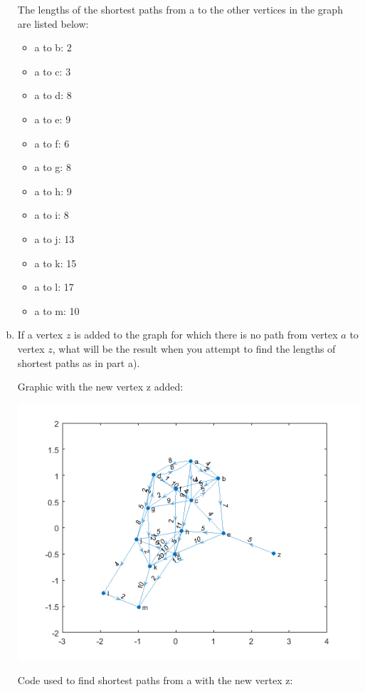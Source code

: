 \documentclass[../report/main.tex]{subfiles}
\begin{document}
\begin{enumerate}[a)]
    The lengths of the shortest paths from a to the other vertices in the graph are listed below:
    \begin{itemize}
        \item a to b: 2
        \item a to c: 3
        \item a to d: 8
        \item a to e: 9
        \item a to f: 6
        \item a to g: 8
        \item a to h: 9
        \item a to i: 8
        \item a to j: 13
        \item a to k: 15
        \item a to l: 17
        \item a to m: 10
    \end{itemize}
	\item If a vertex $z$ is added to the graph for which there is no path from vertex $a$ to vertex $z$, what will be the result when you attempt to find the lengths of shortest paths as in part a).

    Graphic with the new vertex z added:

    \includegraphics{../problem_three/img/problem3_digraph_with_z.png}

    Code used to find shortest paths from a with the new vertex z:
  
    


\end{enumerate}
\end{document}
